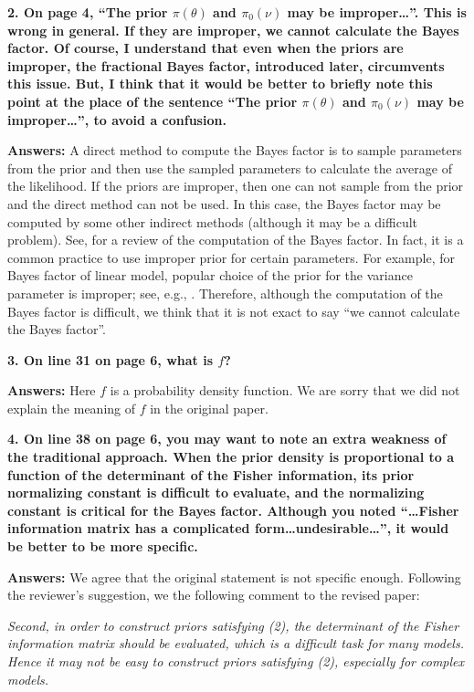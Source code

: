 \documentclass[11pt]{article}
\theoremstyle{plain}
\theoremstyle{definition}
\theoremstyle{remark}
\begin{document}
\textbf{
    2.
    On page 4, ``The prior $\pi(\theta)$ and $\pi_0 (\nu)$ may be improper\dots''.
    This is wrong in general.
    If they are improper, we cannot calculate the Bayes factor.
    Of course, I understand that even when the priors are improper, the fractional Bayes factor, introduced later, circumvents this issue.
    But, I think that it would be better to briefly note this point at the place of the sentence ``The prior $\pi(\theta)$ and $\pi_0 (\nu)$ may be improper\dots'', to avoid a confusion.
}

\textbf{Answers:}
A direct method to compute the Bayes factor is to sample parameters from the prior and then use the sampled parameters to calculate the average of the likelihood.
If the priors are improper, then one can not sample from the prior and the direct method can not be used.
In this case, the Bayes factor may be computed by some other indirect methods (although it may be a difficult problem).
See, \cite{Friel2012} for a review of the computation of the Bayes factor.
In fact, it is a common practice to use improper prior for certain parameters.
For example, for Bayes factor of linear model, popular choice of the prior for the variance parameter is improper; see, e.g., \cite{Liang2008Mixtures}.
Therefore, although the computation of the Bayes factor is difficult, we think that it is not exact to say ``we cannot calculate the Bayes factor''.

\textbf{
    3. On line 31 on page 6, what is $f$?
}

\textbf{Answers:}
Here $f$ is a probability density function.
We are sorry that we did not explain the meaning of $f$ in the original paper.

\textbf{
    4. On line 38 on page 6, you may want to note an extra weakness of the traditional approach.
    When the prior density is proportional to a function of the determinant of the Fisher information, its prior normalizing constant is difficult to evaluate, and the normalizing constant is critical for the Bayes factor.
    Although you noted ``\dots Fisher information matrix has a complicated form\dots undesirable\dots'', it would be better to be more specific.
}

\textbf{Answers:}
We agree that the original statement is not specific enough.
Following the reviewer's suggestion, we the following comment to the revised paper:
\begin{adjustwidth}{1.5em}{1.5em}
    \emph{
        Second, 
        in order to construct priors satisfying (2), the determinant of the Fisher information matrix should be evaluated, which is a difficult task for many models.
        Hence it may not be easy to construct priors satisfying (2), especially for complex models.
}
\end{adjustwidth}
\end{document}

